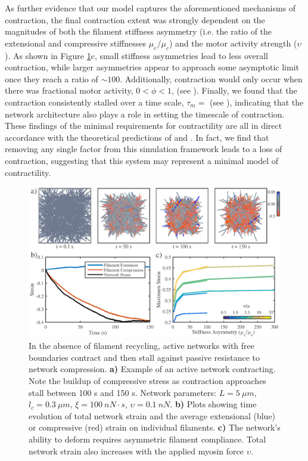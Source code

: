 \documentclass[10pt,letterpaper]{article}
\begin{document}
As further evidence that our model captures the aforementioned mechanisms of contraction, the final contraction extent was strongly dependent on the magnitudes of both the filament stiffness asymmetry (i.e. the ratio of the extensional and compressive stiffnesses $\mu_e/\mu_c$) and the motor activity strength ($\upsilon$).  As shown in Figure \ref{fig:active_con}c, small stiffness asymmetries lead to less overall contraction, while larger asymmetries appear to approach some asymptotic limit once they reach a ratio of $\sim 100$.  Additionally, contraction would only occur when there was fractional motor activity, $0<\phi<1$, (see ).  Finally, we found that the contraction consistently stalled over a time scale, $\tau_m=$ (see ), indicating that the network architecture also plays a role in setting the timescale of contraction.  These findings of the minimal requirements for contractility are all in direct accordance with the theoretical predictions of \cite{1367-2630-14-3-033037} and \cite{PhysRevX.4.041002}.  In fact, we find that removing any single factor from this simulation framework leads to a loss of contraction, suggesting that this system may represent a minimal model of contractility. 

\begin{figure}[h!]
	\centering
	\includegraphics[width=\hsize]{figures/figure4a}
	\caption{\label{fig:active_con} In the absence of filament recycling, active networks with free boundaries contract and then stall against passive resistance to network compression. \textbf{a)}  Example of an active network contracting. Note the buildup of compressive stress as contraction approaches stall between 100 s and 150 s.  Network parameters: $L=5\: \mu m$, $l_c=0.3\: \mu m$, $\xi=100\: nN\cdot s$, $\upsilon=0.1\: nN$.  \textbf{b)} Plots showing time evolution of total network strain and  the average extensional (blue) or compressive (red) strain on individual filaments.   \textbf{c)} The network's ability to deform requires asymmetric filament compliance.  Total network strain also increases with the applied myosin force $\upsilon$.}
\end{figure}
\end{document}
